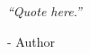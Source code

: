 \newpage
\begin{epigrafe}
    \thispagestyle{empty}
    \centering
    \textit{``Quote here.''}
    \begin{flushright}
       - Author
    \end{flushright}
\end{epigrafe}
